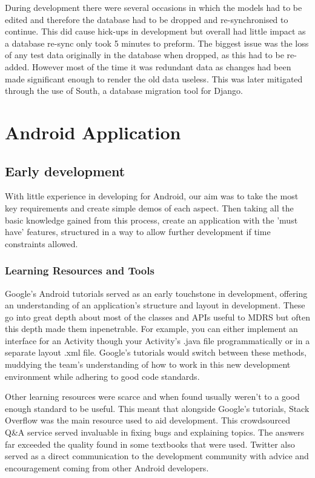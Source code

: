 \documentclass{l3proj}
\begin{document}
During development there were several occasions in which the models had to be edited and therefore the database had to be dropped and re-synchronised to continue. This did cause hick-ups in development but overall had little impact as a database re-sync only took 5 minutes to preform. The biggest issue was the loss of any test data originally in the database when dropped, as this had to be re-added. However most of the time it was redundant data as changes had been made significant enough to render the old data useless. This was later mitigated through the use of South, a database migration tool for Django.
\section{Android Application}

\subsection{Early development} With little experience in developing for Android, our aim was to take the most key requirements and create simple demos of each aspect. Then taking all the basic knowledge gained from this process, create an application with the 'must have' features, structured in a way to allow further development if time constraints allowed.

\subsubsection{Learning Resources and Tools} Google's Android tutorials served as an early touchstone in development, offering an understanding of an application's structure and layout in development. These go into great depth about most of the classes and APIs useful to MDRS but often this depth made them inpenetrable. For example, you can either implement an interface for an Activity though your Activity's .java file programmatically or in a separate layout .xml file. Google's tutorials would switch between these methods, muddying the team's understanding of how to work in this new development environment while adhering to good code standards.

Other learning resources were scarce and when found usually weren't to a good enough standard to be useful. This meant that alongside Google's tutorials, Stack Overflow was the main resource used to aid development. This crowdsourced Q\&A service served invaluable in fixing bugs and explaining topics. The answers far exceeded the quality found in some textbooks that were used. Twitter also served as a direct communication to the development community with advice and encouragement coming from other Android developers.
\end{document}
